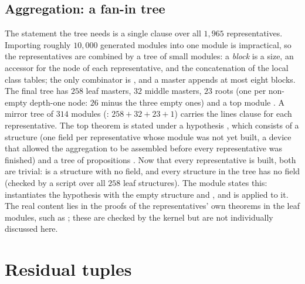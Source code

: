 \documentclass[11pt]{article}
\theoremstyle{remark}
\begin{document}
\subsection{Aggregation: a fan-in tree}\label{sec:agg}

The statement the tree needs is a single clause over all $1{,}965$ representatives. Importing roughly $10{,}000$ generated modules into one module is impractical, so the representatives are combined by a tree of small modules: a \emph{block} is a size, an accessor for the node of each representative, and the concatenation of the local class tables; the only combinator is , and a master appends at most eight blocks. The final tree has $258$ leaf masters, $32$ middle masters, $23$ roots (one per non-empty depth-one node: $26$ minus the three empty ones) and a top module . A mirror tree of $314$ modules (: $258+32+23+1$) carries the lines clause for each representative.
The top theorem  is stated under a hypothesis , which consists of a structure  (one field per representative whose module was not yet built, a device that allowed the aggregation to be assembled before every representative was finished) and a tree of propositions . Now that every representative is built, both are trivial:  is a structure with no field, and every structure in the  tree has no field (checked by a script over all $258$ leaf structures). The module  states this:  instantiates the hypothesis with the empty structure and , and  is  applied to it. The real content lies in the proofs of the representatives' own theorems in the leaf modules, such as ; these are checked by the kernel but are not individually discussed here.

\section{Residual tuples}\label{sec:resid}
\end{document}
